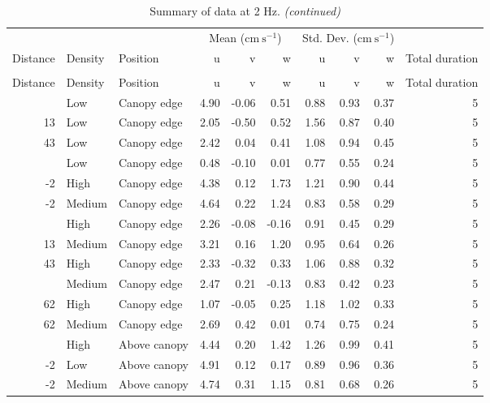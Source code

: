 \documentclass[10pt,]{article}
\begin{document}
\clearpage
\begingroup\fontsize{7}{9}\selectfont

\begin{longtable}{rllrrrrrrr}
\caption{\label{tab:unnamed-chunk-2}Summary of data at 2 Hz.}\\
\toprule
\multicolumn{3}{c}{ } & \multicolumn{3}{c}{Mean ($\text{cm}~\text{s}^{-1}$)} & \multicolumn{3}{c}{Std. Dev. ($\text{cm}~\text{s}^{-1}$)} \\
\cmidrule(l{2pt}r{2pt}){4-6} \cmidrule(l{2pt}r{2pt}){7-9}
Distance & Density & Position & u & v & w & u & v & w & Total duration\\
\midrule
\endfirsthead
\caption[]{\label{tab:unnamed-chunk-2}Summary of data at 2 Hz. \textit{(continued)}}\\
\toprule
Distance & Density & Position & u & v & w & u & v & w & Total duration\\
\midrule
\endhead
\
\endfoot
\bottomrule
\endlastfoot
-2 & Low & Canopy edge & 4.90 & -0.06 & 0.51 & 0.88 & 0.93 & 0.37 & 5\\
13 & Low & Canopy edge & 2.05 & -0.50 & 0.52 & 1.56 & 0.87 & 0.40 & 5\\
43 & Low & Canopy edge & 2.42 & 0.04 & 0.41 & 1.08 & 0.94 & 0.45 & 5\\
\addlinespace
62 & Low & Canopy edge & 0.48 & -0.10 & 0.01 & 0.77 & 0.55 & 0.24 & 5\\
-2 & High & Canopy edge & 4.38 & 0.12 & 1.73 & 1.21 & 0.90 & 0.44 & 5\\
-2 & Medium & Canopy edge & 4.64 & 0.22 & 1.24 & 0.83 & 0.58 & 0.29 & 5\\
\addlinespace
13 & High & Canopy edge & 2.26 & -0.08 & -0.16 & 0.91 & 0.45 & 0.29 & 5\\
13 & Medium & Canopy edge & 3.21 & 0.16 & 1.20 & 0.95 & 0.64 & 0.26 & 5\\
43 & High & Canopy edge & 2.33 & -0.32 & 0.33 & 1.06 & 0.88 & 0.32 & 5\\
\addlinespace
43 & Medium & Canopy edge & 2.47 & 0.21 & -0.13 & 0.83 & 0.42 & 0.23 & 5\\
62 & High & Canopy edge & 1.07 & -0.05 & 0.25 & 1.18 & 1.02 & 0.33 & 5\\
62 & Medium & Canopy edge & 2.69 & 0.42 & 0.01 & 0.74 & 0.75 & 0.24 & 5\\
\addlinespace
-2 & High & Above canopy & 4.44 & 0.20 & 1.42 & 1.26 & 0.99 & 0.41 & 5\\
-2 & Low & Above canopy & 4.91 & 0.12 & 0.17 & 0.89 & 0.96 & 0.36 & 5\\
-2 & Medium & Above canopy & 4.74 & 0.31 & 1.15 & 0.81 & 0.68 & 0.26 & 5\\

\end{longtable}
\end{document}
